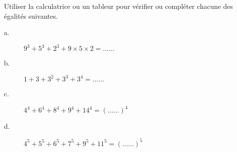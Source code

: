 
Utiliser la calculatrice ou un tableur pour vérifier ou compléter chacune des égalités suivantes. 

\begin{description}
\item[a.] $9^3+5^3+2^3+9 \times 5 \times 2 = \ldots \ldots$ \vplus
\item[b.] $1 + 3+ 3^2 + 3^3+3^4= \ldots \ldots $ \vplus
\item[c.] $4^4+6^4+8^4+9^4+14^4=(\ldots \ldots)^4$ \vplus
\item[d.] $4^5+5^5+6^5+7^5+9^5+11^5=(\ldots \ldots)^5$ \vplus
\end{description}